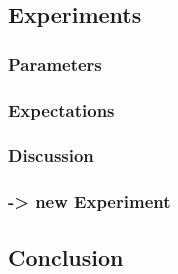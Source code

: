 \documentclass[../Main.tex]{subfiles}
\begin{document}
\subsection{Experiments}
\subsubsection{Parameters}
\subsubsection{Expectations}
\subsubsection{Discussion}
\subsubsection{-> new Experiment}
\subsection{Conclusion}
\end{document}
